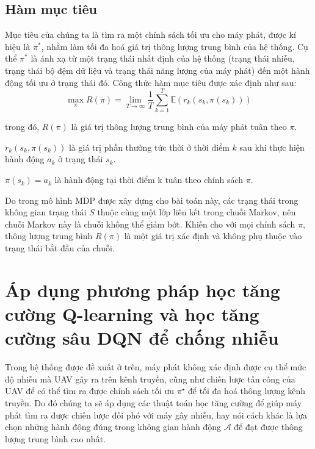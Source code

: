 \documentclass{uetgraduation}
\begin{document}
\subsection{Hàm mục tiêu}
Mục tiêu của chúng ta là tìm ra một chính sách tối ưu cho máy phát, được kí hiệu là $\pi^*$, nhằm làm tối đa hoá giá trị thông lượng trung bình
của hệ thống. Cụ thể $\pi^*$ là ánh xạ từ một trạng thái nhất định của hệ thống (trạng thái nhiễu, trạng thái bộ đệm dữ liệu và trạng thái năng
lượng của máy phát) đến một hành động tối ưu ở trạng thái đó.
Công thức hàm mục tiêu được xác định như sau:
\begin{equation}
    \max_{\pi} R(\pi) = \lim_{T \to \infty} \frac{1}{T} \sum_{k=1}^{T} \mathbb{E}\left( r_k(s_k, \pi(s_k)) \right)
\end{equation}

trong đó, $R(\pi)$ là giá trị thông lượng trung bình của máy phát tuân theo $\pi$.

$r_k(s_k, \pi(s_k))$ là giá trị phần thưởng tức thời ở thời điểm $k$ sau khi thực hiện hành động $a_k$ ở trạng thái $s_k$.

$\pi(s_k) = a_k$ là hành động tại thời điểm k tuân theo chính sách $\pi$.

Do trong mô hình MDP được xây dựng cho bài toán này, các trạng thái trong không gian trạng thái $S$ thuộc cùng một lớp liên kết trong chuỗi Markov, nên chuỗi Markov này là chuỗi không thể giảm bớt.
Khiến cho với mọi chính sách $\pi$, thông lượng trung bình $R(\pi)$ là một giá trị xác định và không phụ thuộc vào trạng thái bắt đầu của chuỗi.

\section{Áp dụng phương pháp học tăng cường Q-learning và học tăng cường sâu DQN để chống nhiễu}
Trong hệ thống được đề xuất ở trên, máy phát không xác định được cụ thể mức độ nhiễu mà UAV gây ra trên kênh truyền, cũng như chiến lược tấn công của UAV để có thể tìm ra được
chính sách tối ưu $\pi^\star$ để tối đa hoá thông lượng kênh truyền. Do đó chúng ta sẽ áp dụng các thuật toán học tăng cường để giúp máy phát tìm ra được chiến lược đối
phó với máy gây nhiễu, hay nói cách khác là lựa chọn những hành động đúng trong không gian hành động $\mathcal{A}$ để đạt được thông lượng trung bình cao nhất.
\end{document}
